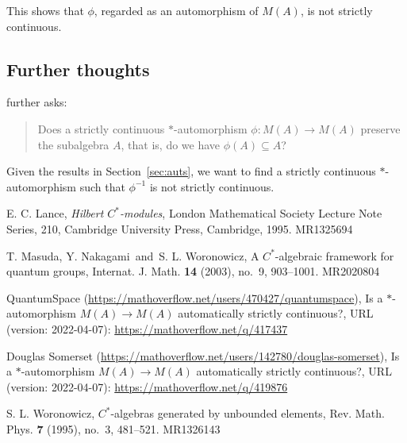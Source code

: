 \documentclass[a4paper,12pt]{article}
\theoremstyle{plain}
\theoremstyle{definition}
\begin{document}
This shows that $\phi$, regarded as an automorphism of $M(A)$, is not strictly continuous.



\subsection{Further thoughts}

\cite{qs} further asks:

\begin{quote}
Does a strictly continuous $*$-automorphism $\phi:M(A)\rightarrow M(A)$ preserve the subalgebra $A$,
that is, do we have $\phi(A) \subseteq A$?
\end{quote}

Given the results in Section~\ref{sec:auts}, we want to find a strictly continuous $*$-automorphism
such that $\phi^{-1}$ is not strictly continuous.


\begin{thebibliography}{99}

 E. C. Lance, {\it Hilbert $C^*$-modules}, London Mathematical Society Lecture Note Series, 210, Cambridge University Press, Cambridge, 1995. MR1325694

 T. Masuda, Y. Nakagami\ and\ S. L. Woronowicz, A $C^\ast$-algebraic framework for quantum groups, Internat. J. Math. {\bf 14} (2003), no.~9, 903--1001. MR2020804

 QuantumSpace {\footnotesize (\url{https://mathoverflow.net/users/470427/quantumspace})}, Is a $*$-automorphism $M(A) \to M(A)$ automatically strictly continuous?, URL (version: 2022-04-07): \url{https://mathoverflow.net/q/417437}

 Douglas Somerset {\footnotesize (\url{https://mathoverflow.net/users/142780/douglas-somerset})}, Is a $*$-automorphism $M(A) \to M(A)$ automatically strictly continuous?, URL (version: 2022-04-07): \url{https://mathoverflow.net/q/419876}

 S. L. Woronowicz, $C^*$-algebras generated by unbounded elements, Rev. Math. Phys. {\bf 7} (1995), no.~3, 481--521. MR1326143

\end{thebibliography}
\end{document}
